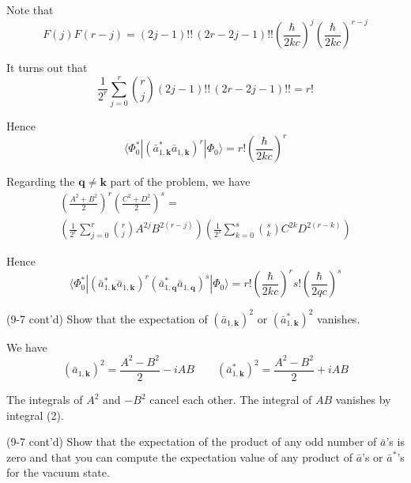 \documentclass[12pt]{article}
\begin{document}
Note that
\begin{equation*}
F(j)F(r-j)=
(2j-1)!!\,(2r-2j-1)!!
\left(\frac{\hbar}{2kc}\right)^j
\left(\frac{\hbar}{2kc}\right)^{r-j}
\end{equation*}

It turns out that
\begin{equation*}
\frac{1}{2^r}\sum_{j=0}^r\binom{r}{j}(2j-1)!!\,(2r-2j-1)!!=r!
\end{equation*}

Hence
\begin{equation*}
\langle\Phi_0^*|(\bar a_{1,\mathbf k}^*\bar a_{1,\mathbf k})^r|\Phi_0\rangle
=r!\left(\frac{\hbar}{2kc}\right)^r
\end{equation*}

Regarding the $\mathbf q\ne\mathbf k$ part of the problem, we have
\begin{multline*}
\left(\frac{A^2+B^2}{2}\right)^r\left(\frac{C^2+D^2}{2}\right)^s={}
\\
\left(\frac{1}{2^r}\sum_{j=0}^r\binom{r}{j}A^{2j}B^{2(r-j)}\right)
\left(\frac{1}{2^s}\sum_{k=0}^s\binom{s}{k}C^{2k}D^{2(r-k)}\right)
\end{multline*}

Hence
\begin{equation*}
\langle\Phi_0^*|
(\bar a_{1,\mathbf k}^*\bar a_{1,\mathbf k})^r
(\bar a_{1,\mathbf q}^*\bar a_{1,\mathbf q})^s
|\Phi_0\rangle
=r!\left(\frac{\hbar}{2kc}\right)^r
s!\left(\frac{\hbar}{2qc}\right)^s
\end{equation*}

(9-7 cont'd)
Show that the expectation of 
$(\bar a_{1,\mathbf k})^2$ or
$(\bar a_{1,\mathbf k}^*)^2$ vanishes.

\bigskip
We have
\begin{equation*}
(\bar a_{1,\mathbf k})^2=\frac{A^2-B^2}{2}-iAB
\qquad
(\bar a_{1,\mathbf k}^*)^2=\frac{A^2-B^2}{2}+iAB
\end{equation*}

The integrals of $A^2$ and $-B^2$ cancel each other.
The integral of $AB$ vanishes by integral (2).

\bigskip
(9-7 cont'd)
Show that the expectation of the product of any odd number of
$\bar a$'s is zero and that you can compute the expectation value of
any product of $\bar a$'s or $\bar a^*$'s for the vacuum state.

\end{document}
